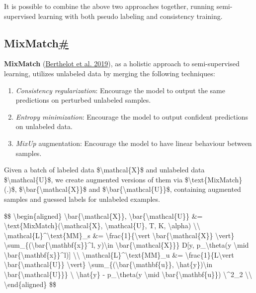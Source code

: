 It is possible to combine the above two approaches together, running semi-supervised learning with both pseudo labeling and consistency training.

\subsection{\texorpdfstring{MixMatch\hyperref[mixmatch]{\#}}{MixMatch\#}}\label{mixmatch}

\textbf{MixMatch} (\href{https://arxiv.org/abs/1905.02249}{Berthelot et al. 2019}), as a holistic approach to semi-supervised learning, utilizes unlabeled data by merging the following techniques:

\begin{enumerate}
\tightlist
\item
  \emph{Consistency regularization}: Encourage the model to output the same predictions on perturbed unlabeled samples.
\item
  \emph{Entropy minimization}: Encourage the model to output confident predictions on unlabeled data.
\item
  \emph{MixUp} augmentation: Encourage the model to have linear behaviour between samples.
\end{enumerate}

Given a batch of labeled data \$\textbackslash mathcal\{X\}\$ and unlabeled data \$\textbackslash mathcal\{U\}\$, we create augmented versions of them via \$\textbackslash text\{MixMatch\}(.)\$, \$\textbackslash bar\{\textbackslash mathcal\{X\}\}\$ and \$\textbackslash bar\{\textbackslash mathcal\{U\}\}\$, containing augmented samples and guessed labels for unlabeled examples.

\$\$ \textbackslash begin\{aligned\} \textbackslash bar\{\textbackslash mathcal\{X\}\}, \textbackslash bar\{\textbackslash mathcal\{U\}\} \&= \textbackslash text\{MixMatch\}(\textbackslash mathcal\{X\}, \textbackslash mathcal\{U\}, T, K, \textbackslash alpha) \textbackslash\textbackslash{} \textbackslash mathcal\{L\}\^{}\textbackslash text\{MM\}\_s \&= \textbackslash frac\{1\}\{\textbackslash vert \textbackslash bar\{\textbackslash mathcal\{X\}\} \textbackslash vert\} \textbackslash sum\_\{(\textbackslash bar\{\textbackslash mathbf\{x\}\}\^{}l, y)\textbackslash in \textbackslash bar\{\textbackslash mathcal\{X\}\}\} D{[}y, p\_\textbackslash theta(y \textbackslash mid \textbackslash bar\{\textbackslash mathbf\{x\}\}\^{}l){]} \textbackslash\textbackslash{} \textbackslash mathcal\{L\}\^{}\textbackslash text\{MM\}\_u \&= \textbackslash frac\{1\}\{L\textbackslash vert \textbackslash bar\{\textbackslash mathcal\{U\}\} \textbackslash vert\} \textbackslash sum\_\{(\textbackslash bar\{\textbackslash mathbf\{u\}\}, \textbackslash hat\{y\})\textbackslash in \textbackslash bar\{\textbackslash mathcal\{U\}\}\} \textbackslash\textbar{} \textbackslash hat\{y\} - p\_\textbackslash theta(y \textbackslash mid \textbackslash bar\{\textbackslash mathbf\{u\}\}) \textbackslash\textbar\^{}2\_2 \textbackslash\textbackslash{} \textbackslash end\{aligned\} \$\$

